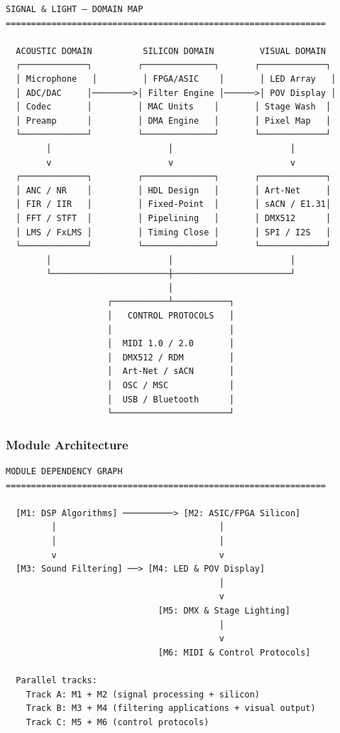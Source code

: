 \documentclass[11pt,letterpaper]{article}
\begin{document}
\begin{asciibox}
\begin{verbatim}
SIGNAL & LIGHT — DOMAIN MAP
===============================================================

  ACOUSTIC DOMAIN          SILICON DOMAIN         VISUAL DOMAIN
  ┌─────────────┐         ┌──────────────┐       ┌─────────────┐
  │ Microphone   │         │ FPGA/ASIC    │       │ LED Array   │
  │ ADC/DAC     │────────>│ Filter Engine │──────>│ POV Display │
  │ Codec       │         │ MAC Units    │       │ Stage Wash  │
  │ Preamp      │         │ DMA Engine   │       │ Pixel Map   │
  └─────────────┘         └──────────────┘       └─────────────┘
        │                       │                       │
        v                       v                       v
  ┌─────────────┐         ┌──────────────┐       ┌─────────────┐
  │ ANC / NR    │         │ HDL Design   │       │ Art-Net     │
  │ FIR / IIR   │         │ Fixed-Point  │       │ sACN / E1.31│
  │ FFT / STFT  │         │ Pipelining   │       │ DMX512      │
  │ LMS / FxLMS │         │ Timing Close │       │ SPI / I2S   │
  └─────────────┘         └──────────────┘       └─────────────┘
        │                       │                       │
        └───────────────────────┼───────────────────────┘
                                │
                    ┌───────────┴───────────┐
                    │   CONTROL PROTOCOLS   │
                    │                       │
                    │  MIDI 1.0 / 2.0       │
                    │  DMX512 / RDM         │
                    │  Art-Net / sACN       │
                    │  OSC / MSC            │
                    │  USB / Bluetooth      │
                    └───────────────────────┘
\end{verbatim}
\end{asciibox}

\subsubsection{Module Architecture}

\begin{asciibox}
\begin{verbatim}
MODULE DEPENDENCY GRAPH
===============================================================

  [M1: DSP Algorithms] ──────────> [M2: ASIC/FPGA Silicon]
         │                                │
         │                                │
         v                                v
  [M3: Sound Filtering] ──> [M4: LED & POV Display]
                                          │
                                          v
                              [M5: DMX & Stage Lighting]
                                          │
                                          v
                              [M6: MIDI & Control Protocols]

  Parallel tracks:
    Track A: M1 + M2 (signal processing + silicon)
    Track B: M3 + M4 (filtering applications + visual output)
    Track C: M5 + M6 (control protocols)
\end{verbatim}
\end{asciibox}
\end{document}
